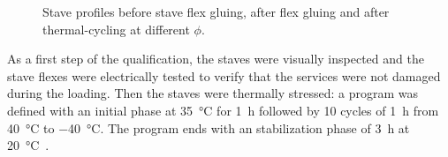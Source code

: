 \begin{figure}
        \centering
\caption{Stave profiles before stave flex gluing, after flex gluing and after thermal-cycling at different $\phi$.}
\label{fig:StavePlan_VS_FlexGluing}
\end{figure}

As a first step of the qualification, the staves were visually inspected and the  stave flexes  were  electrically tested to verify that the services were not damaged during the loading. Then  the staves were thermally stressed:  a program was defined with an initial phase at \SI{35}{\celsius} for \SI{1}{\hour} followed by 10 cycles of \SI{1}{\hour} from \SI{40}{\celsius} to \SI{-40}{\celsius}. The program ends with an stabilization phase of \SI{3}{\hour} at \SI{20}{\celsius}~\cite{LoadingNote}.

